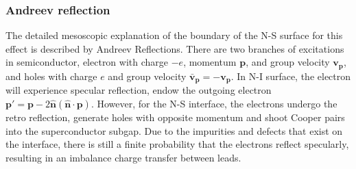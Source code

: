 \subsubsection{Andreev reflection}
The detailed mesoscopic explanation of the boundary of the N-S surface for this effect is described by Andreev Reflections. There are two branches of excitations in semiconductor, electron with charge $-e$, momentum $\mathbf{p}$, and group velocity $\mathbf{v_p}$, and holes with charge $e$ and group velocity $\mathbf{\bar{v}_p} = -\mathbf{v_p}$. In N-I surface, the electron will experience specular reflection, endow the outgoing electron $\mathbf{p'} = \mathbf{p} - 2\hat{\mathbf{n}}(\hat{\mathbf{n}}\cdot\mathbf{p})$. However, for the N-S interface, the electrons undergo the retro reflection, generate holes with opposite momentum and shoot Cooper pairs into the superconductor subgap. Due to the impurities and defects that exist on the interface, there is still a finite probability that the electrons reflect specularly, resulting in an imbalance charge transfer between leads.
